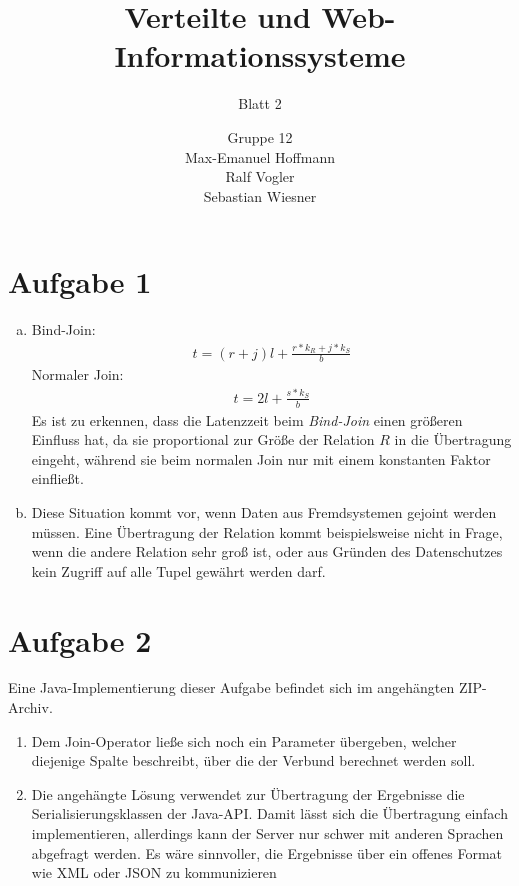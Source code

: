 \documentclass[11pt,a4paper]{scrartcl}
\begin{document}
\author{Gruppe 12\\Max-Emanuel Hoffmann\\Ralf Vogler\\Sebastian Wiesner}
\title{Verteilte und Web-Informationssysteme}
\subtitle{Blatt 2}

\maketitle

\section*{Aufgabe 1}

\begin{enumerate}[a)]
\item Bind-Join:
\begin{align*}
t = (r + j)l + \frac{r*k_R + j*k_S}{b}
\end{align*}
Normaler Join:
\begin{align*}
t = 2l + \frac{s*k_S}{b}
\end{align*}
Es ist zu erkennen, dass die Latenzzeit beim \emph{Bind-Join} einen größeren
Einfluss hat, da sie proportional zur Größe der Relation $R$ in die 
Übertragung eingeht, während sie beim normalen Join nur mit einem konstanten 
Faktor einfließt.
\item Diese Situation kommt vor, wenn Daten aus Fremdsystemen gejoint werden
müssen.  Eine Übertragung der Relation kommt beispielsweise nicht in Frage, 
wenn die andere Relation sehr groß ist, oder aus Gründen des Datenschutzes 
kein Zugriff auf alle Tupel gewährt werden darf.
\end{enumerate}

\section*{Aufgabe 2}

Eine Java-Implementierung dieser Aufgabe befindet sich im angehängten ZIP-Archiv.

\begin{enumerate}
\item Dem Join-Operator ließe sich noch ein Parameter übergeben, welcher diejenige
Spalte beschreibt, über die der Verbund berechnet werden soll.
\item Die angehängte Lösung verwendet zur Übertragung der Ergebnisse die
Serialisierungsklassen der Java-API.  Damit lässt sich die Übertragung einfach 
implementieren, allerdings kann der Server nur schwer mit anderen Sprachen 
abgefragt werden.  Es wäre sinnvoller, die Ergebnisse über ein offenes Format 
wie XML oder JSON zu kommunizieren
\end{enumerate}
\end{document}
